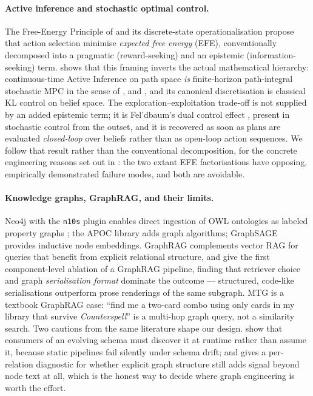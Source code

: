 \documentclass[11pt,a4paper]{article}
\theoremstyle{definition}
\theoremstyle{plain}
\begin{document}
\paragraph{Active inference and stochastic optimal control.} The Free-Energy Principle of \citet{friston2010free} and its discrete-state operationalisation \citep{sajid2021active} propose that action selection minimise \emph{expected free energy} (EFE), conventionally decomposed into a pragmatic (reward-seeking) and an epistemic (information-seeking) term. \citet{kaufmann2026aifcontrol} shows that this framing inverts the actual mathematical hierarchy: continuous-time Active Inference on path space \emph{is} finite-horizon path-integral stochastic MPC in the sense of \citet{kappen2005path}, \citet{todorov2009efficient} and \citet{williams2017mppi}, and its canonical discretisation is classical KL control on belief space. The exploration--exploitation trade-off is not supplied by an added epistemic term; it is Fel'dbaum's dual control effect \citep{feldbaum1960dual}, present in stochastic control from the outset, and it is recovered as soon as plans are evaluated \emph{closed-loop} over beliefs rather than as open-loop action sequences. We follow that result rather than the conventional decomposition, for the concrete engineering reasons set out in : the two extant EFE factorisations have opposing, empirically demonstrated failure modes, and both are avoidable.

\paragraph{Knowledge graphs, GraphRAG, and their limits.} Neo4j with the \texttt{n10s} plugin enables direct ingestion of OWL ontologies as labeled property graphs \citep{neo4j_n10s}; the APOC library adds graph algorithms; GraphSAGE \citep{hamilton2017inductive} provides inductive node embeddings. GraphRAG \citep{edge2024graphrag} complements vector RAG for queries that benefit from explicit relational structure, and \citet{liao2026graphragbp} give the first component-level ablation of a GraphRAG pipeline, finding that retriever choice and graph \emph{serialisation format} dominate the outcome --- structured, code-like serialisations outperform prose renderings of the same subgraph. MTG is a textbook GraphRAG case: ``find me a two-card combo using only cards in my library that survive \emph{Counterspell}'' is a multi-hop graph query, not a similarity search. Two cautions from the same literature shape our design. \citet{diettrich2026harp} show that consumers of an evolving schema must discover it at runtime rather than assume it, because static pipelines fail silently under schema drift; and \citet{romanova2026relationships} gives a per-relation diagnostic for whether explicit graph structure still adds signal beyond node text at all, which is the honest way to decide where graph engineering is worth the effort.
\end{document}
